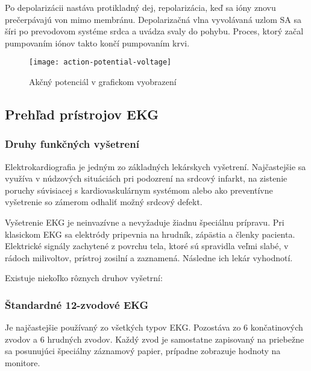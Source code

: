 \documentclass[titlepage,12pt]{article}
\begin{document}
Po depolarizácii nastáva protikladný dej, repolarizácia, keď sa ióny znovu prečerpávajú von mimo membránu. Depolarizačná vlna vyvolávaná uzlom SA sa šíri po prevodovom systéme srdca a uvádza svaly do pohybu. Proces, ktorý začal pumpovaním iónov takto končí pumpovaním krvi. 

\begin{figure}[!ht]
\begin{center}
\texttt{[image: action-potential-voltage]}
\caption{Akčný potenciál v grafickom vyobrazení}
\end{center}
\end{figure}



\newpage 
\subsection{Prehľad prístrojov EKG}
\subsubsection{Druhy funkčných vyšetrení}
Elektrokardiografia je jedným zo základných lekárskych vyšetrení. Najčastejšie sa využíva \linebreak v núdzových situáciách pri podozrení na srdcový infarkt, na zistenie poruchy súvisiacej \linebreak s kardiovaskulárnym systémom alebo ako preventívne vyšetrenie so zámerom odhaliť možný srdcový defekt.

Vyšetrenie EKG je neinvazívne a nevyžaduje žiadnu špeciálnu prípravu. Pri klasickom EKG sa elektródy pripevnia na hrudník, zápästia a členky pacienta. Elektrické signály zachytené \linebreak z povrchu tela, ktoré sú spravidla veľmi slabé, v rádoch milivoltov, prístroj zosilní a zaznamená. Následne ich lekár vyhodnotí.

Existuje niekoľko rôznych druhov vyšetrní:
\subsubsection*{Štandardné 12-zvodové EKG}
Je najčastejšie používaný zo všetkých typov EKG. Pozostáva zo 6 končatinových zvodov \linebreak a 6 hrudných zvodov. Každý zvod je samostatne zapisovaný na priebežne sa posunujúci špeciálny záznamový papier, prípadne zobrazuje hodnoty na monitore.
\end{document}
